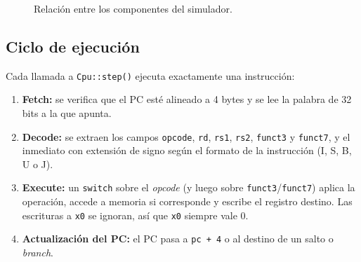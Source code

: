\documentclass[11pt,a4paper]{article}
\begin{document}
\begin{figure}[h]
  \centering
  \caption{Relación entre los componentes del simulador.}
\end{figure}

\subsection{Ciclo de ejecución}

Cada llamada a \texttt{Cpu::step()} ejecuta exactamente una instrucción:

\begin{enumerate}
  \item \textbf{Fetch:} se verifica que el PC esté alineado a 4 bytes y se lee la
    palabra de 32 bits a la que apunta.
  \item \textbf{Decode:} se extraen los campos \texttt{opcode}, \texttt{rd},
    \texttt{rs1}, \texttt{rs2}, \texttt{funct3} y \texttt{funct7}, y el inmediato con
    extensión de signo según el formato de la instrucción (I, S, B, U o J).
  \item \textbf{Execute:} un \texttt{switch} sobre el \textit{opcode} (y luego sobre
    \texttt{funct3}/\texttt{funct7}) aplica la operación, accede a memoria si
    corresponde y escribe el registro destino. Las escrituras a \texttt{x0} se ignoran,
    así que \texttt{x0} siempre vale 0.
  \item \textbf{Actualización del PC:} el PC pasa a \texttt{pc + 4} o al destino de un
    salto o \textit{branch}.
\end{enumerate}
\end{document}
